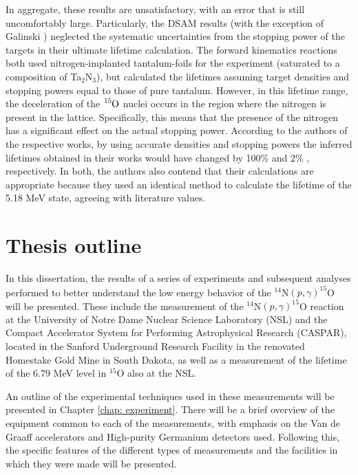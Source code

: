In aggregate, these results are unsatisfactory, with an error that is still uncomfortably large. Particularly, the DSAM results (with the exception of Galinski \cite{Galinski2014}) neglected the systematic uncertainties from the stopping power of the targets in their ultimate lifetime calculation. The forward kinematics reactions \cite{Bertone2001, Schurmann2008} both used nitrogen-implanted tantalum-foils for the experiment (saturated to a composition of Ta$_{2}$N$_{3}$), but calculated the lifetimes assuming target densities and stopping powers equal to those of pure tantalum. However, in this lifetime range, the deceleration of the $\ce{^{15}O}$ nuclei occurs in the region where the nitrogen is present in the lattice. Specifically, this means that the presence of the nitrogen has a significant effect on the actual stopping power. According to the authors of the respective works, by using accurate densities and stopping powers the inferred lifetimes obtained in their works would have changed by 100\% \cite{Bertone2001} and 2\% \cite{Schurmann2008}, respectively. In both, the authors also contend that their calculations are appropriate because they used an identical method to calculate the lifetime of the 5.18 MeV state, agreeing with literature values.





\section{Thesis outline}
\label{sec: thesis outline}

In this dissertation, the results of a series of experiments and subsequent analyses performed to better understand the low energy behavior of the $^{14}$N$\left( p,\gamma \right) ^{15}$O will be presented. These include the measurement of the $^{14}$N$\left( p,\gamma \right) ^{15}$O reaction at the University of Notre Dame Nuclear Science Laboratory (NSL) and the Compact Accelerator System for Performing Astrophysical Research (CASPAR), located in the Sanford Underground Research Facility in the renovated Homestake Gold Mine in South Dakota, as well as a measurement of the lifetime of the 6.79 MeV level in $^{15}$O also at the NSL. 

An outline of the experimental techniques used in these measurements will be presented in Chapter \ref{chap: experiment}. There will be a brief overview of the equipment common to each of the measurements, with emphasis on the Van de Graaff accelerators and High-purity Germanium detectors used. Following this, the specific features of the different types of measurements and the facilities in which they were made will be presented. 

